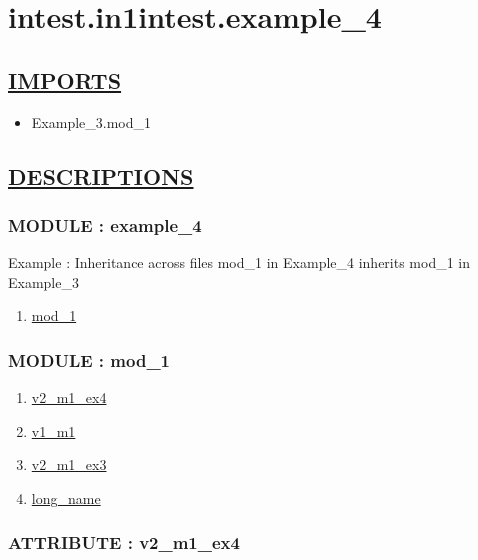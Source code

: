 \chapter*{intest.in1intest.example\_4}

\section*{\underline{IMPORTS}}
\begin{itemize}
\item Example\_3.mod\_1
\end{itemize}

\section*{\underline{DESCRIPTIONS}}
\subsection*{MODULE : example\_4}
\hypertarget{ecldoc:intest.in1intest.example_4_intest.in1intest.example_4}{}
Example : Inheritance across files mod\_1 in Example\_4 inherits mod\_1 in Example\_3 \\
\begin{enumerate}
\item \hyperlink{ecldoc:intest.in1intest.example_4_intest.in1intest.example_4.mod_1}{mod\_1}
\end{enumerate}
\subsection*{MODULE : mod\_1}
\hypertarget{ecldoc:intest.in1intest.example_4_intest.in1intest.example_4.mod_1}{}
\begin{enumerate}
\item \hyperlink{ecldoc:intest.in1intest.example_4_intest.in1intest.example_4.mod_1.v2_m1_ex4}{v2\_m1\_ex4}
\item \hyperlink{ecldoc:intest.in1intest.example_4_example_3.mod_1.v1_m1}{v1\_m1}
\item \hyperlink{ecldoc:intest.in1intest.example_4_example_3.mod_1.v2_m1_ex3}{v2\_m1\_ex3}
\item \hyperlink{ecldoc:intest.in1intest.example_4_example_3.mod_1.long_name}{long\_name}
\end{enumerate}
\subsection*{ATTRIBUTE : v2\_m1\_ex4}
\hypertarget{ecldoc:intest.in1intest.example_4_intest.in1intest.example_4.mod_1.v2_m1_ex4}{}
